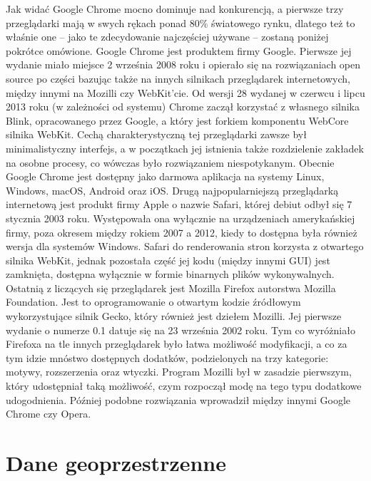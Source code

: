 Jak widać Google Chrome mocno dominuje nad konkurencją, a pierwsze trzy przeglądarki mają w swych rękach ponad 80\% światowego rynku, dlatego też to właśnie one – jako te zdecydowanie najczęściej używane – zostaną poniżej pokrótce omówione.\newline
Google Chrome jest produktem firmy Google. Pierwsze jej wydanie miało miejsce 2 września 2008 roku i opierało się na rozwiązaniach open source po części bazując także na innych silnikach przeglądarek internetowych, między innymi na Mozilli czy WebKit'cie. Od wersji 28 wydanej w czerwcu i lipcu 2013 roku (w zależności od systemu) Chrome zaczął korzystać z własnego silnika Blink, opracowanego przez Google, a który jest forkiem komponentu WebCore silnika WebKit. Cechą charakterystyczną tej przeglądarki zawsze był minimalistyczny interfejs, a w początkach jej istnienia także rozdzielenie zakładek na osobne procesy, co wówczas było rozwiązaniem niespotykanym. Obecnie Google Chrome jest dostępny jako darmowa aplikacja na systemy Linux, Windows, macOS, Android oraz iOS.\newline
Drugą najpopularniejszą przeglądarką internetową jest produkt firmy Apple o nazwie Safari, której debiut odbył się 7 stycznia 2003 roku. Występowała ona wyłącznie na urządzeniach amerykańskiej firmy, poza okresem między rokiem 2007 a 2012, kiedy to dostępna była również wersja dla systemów Windows. Safari do renderowania stron korzysta z otwartego silnika WebKit, jednak pozostała część jej kodu (między innymi GUI) jest zamknięta, dostępna wyłącznie w formie binarnych plików wykonywalnych.\newline
Ostatnią z liczących się przeglądarek jest Mozilla Firefox autorstwa Mozilla Foundation. Jest to oprogramowanie o otwartym kodzie źródłowym wykorzystujące silnik Gecko, który również jest dziełem Mozilli. Jej pierwsze wydanie o numerze 0.1 datuje się na 23 września 2002 roku. Tym co wyróżniało Firefoxa na tle innych przeglądarek było łatwa możliwość modyfikacji, a co za tym idzie mnóstwo dostępnych dodatków, podzielonych na trzy kategorie: motywy, rozszerzenia oraz wtyczki. Program Mozilli był w zasadzie pierwszym, który udostępniał taką możliwość, czym rozpoczął modę na tego typu dodatkowe udogodnienia. Później podobne rozwiązania wprowadził między innymi Google Chrome czy Opera.

\section{Dane geoprzestrzenne}

